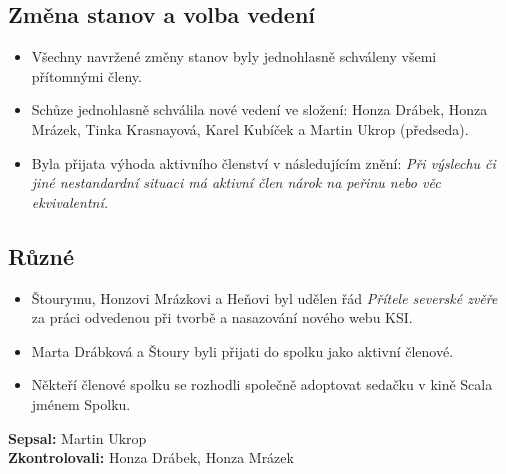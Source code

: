 \documentclass[11pt,a4paper]{article}
\begin{document}
\subsection*{Změna stanov a volba vedení}
\begin{itemize}[itemsep=0pt]
\item Všechny navržené změny stanov byly jednohlasně schváleny všemi přítomnými členy.
\item Schůze jednohlasně schválila nové vedení ve složení: Honza Drábek, Honza Mrázek, Tinka Krasnayová, Karel Kubíček a Martin Ukrop (předseda).
\item Byla přijata výhoda aktivního členství v následujícím znění: \textit{Při výslechu či jiné nestandardní situaci má aktivní člen nárok na peřinu nebo věc ekvivalentní.}
\end{itemize}

\subsection*{Různé}
\begin{itemize}[itemsep=0pt]
\item Štourymu, Honzovi Mrázkovi a Heňovi byl udělen řád \textit{Přítele severské zvěře} za práci odvedenou při tvorbě a nasazování nového webu KSI.
\item Marta Drábková a Štoury byli přijati do spolku jako aktivní členové.
\item Někteří členové spolku se rozhodli společně adoptovat sedačku v kině Scala jménem Spolku.
\end{itemize}
\textbf{Sepsal:} Martin Ukrop\\
\textbf{Zkontrolovali:} Honza Drábek, Honza Mrázek 
\end{document}
